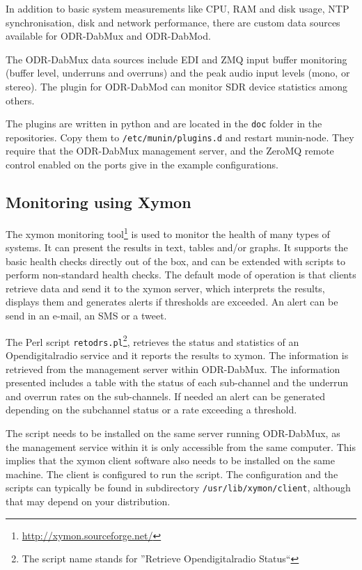 In addition to basic system measurements like CPU, RAM and disk usage, NTP
synchronisation, disk and network performance, there are custom data sources
available for ODR-DabMux and ODR-DabMod.

The ODR-DabMux data sources include EDI and ZMQ input buffer monitoring (buffer
level, underruns and overruns) and the peak audio input levels (mono, or
stereo). The plugin for ODR-DabMod can monitor SDR device statistics among
others.

The plugins are written in python and are located in the \verb+doc+ folder in
the repositories. Copy them to \texttt{/etc/munin/plugins.d} and restart
munin-node. They require that the ODR-DabMux management
server, and the ZeroMQ remote control enabled on the ports give in the example
configurations.


\subsection{Monitoring using Xymon}
The xymon monitoring tool\footnote{\url{http://xymon.sourceforge.net/}} is used
to monitor the health of many types of systems. It can present the results in
text, tables and/or graphs. It supports the basic health checks directly out of
the box, and can be extended with scripts to perform non-standard health checks.
The default mode of operation is that clients retrieve data and send it to the
xymon server, which interprets the results, displays them and generates alerts
if thresholds are exceeded. An alert can be send in an e-mail, an SMS or a
tweet.

The Perl script \verb+retodrs.pl+\footnote{The script name stands for
''Retrieve Opendigitalradio Status``}, retrieves the status and
statistics of an Opendigitalradio service and it reports the results to xymon.
The information is retrieved from the management server within ODR-DabMux. The
information presented includes a table with the status of each sub-channel and
the underrun and overrun rates on the sub-channels. If needed an alert can be
generated depending on the subchannel status or a rate exceeding a threshold.

The script needs to be installed on the same server running ODR-DabMux, as the
management service within it is only accessible from the same computer. This
implies that the xymon client software also needs to be installed on the same
machine. The client is configured to run the script.
The configuration and the scripts can typically be found in subdirectory
\verb+/usr/lib/xymon/client+, although that may depend on your distribution.

